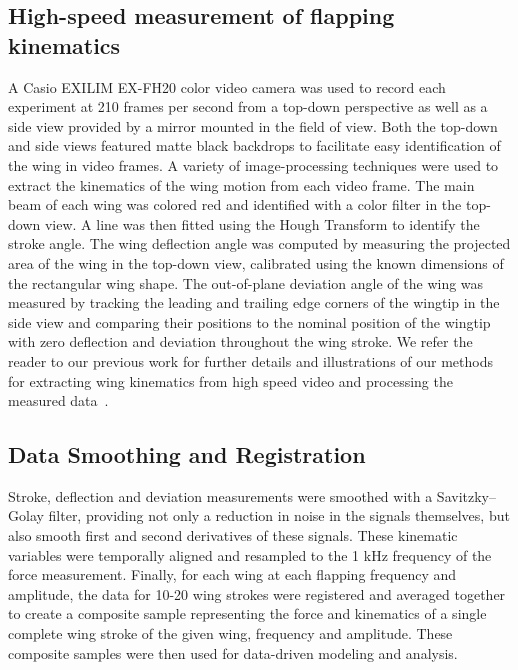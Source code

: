 \documentclass{article}
\begin{document}
\subsection*{High-speed measurement of flapping kinematics}
A Casio EXILIM EX-FH20 color video camera was used to record each experiment at
210 frames per second from a top-down perspective as well as a side view
provided by a mirror mounted in the field of view. Both the top-down and side
views featured matte black backdrops to facilitate easy identification of the
wing in video frames. A variety of image-processing techniques were used to
extract the kinematics of the wing motion from each video frame. The main beam
of each wing was colored red and identified with a color filter in the top-down
view. A line was then fitted using the Hough Transform to identify the stroke
angle. The wing deflection angle was computed by measuring the projected area of
the wing in the top-down view, calibrated using the known dimensions of the
rectangular wing shape. The out-of-plane deviation angle of the wing was
measured by tracking the leading and trailing edge corners of the wingtip in the
side view and comparing their positions to the nominal position of the wingtip
with zero deflection and deviation throughout the wing stroke. We refer the
reader to our previous work for further details and illustrations of our methods
for extracting wing kinematics from high speed video and processing the measured
data~\cite{richter2012thesis}.

\subsection*{Data Smoothing and Registration}
Stroke, deflection and deviation measurements were smoothed with a
Savitzky–Golay filter, providing not only a reduction in noise in the signals
themselves, but also smooth first and second derivatives of these signals. These
kinematic variables were temporally aligned and resampled to the 1 kHz frequency
of the force measurement. Finally, for each wing at each flapping frequency and
amplitude, the data for 10-20 wing strokes were registered and averaged together
to create a composite sample representing the force and kinematics of a single
complete wing stroke of the given wing, frequency and amplitude. These composite
samples were then used for data-driven modeling and analysis.


\end{document}

